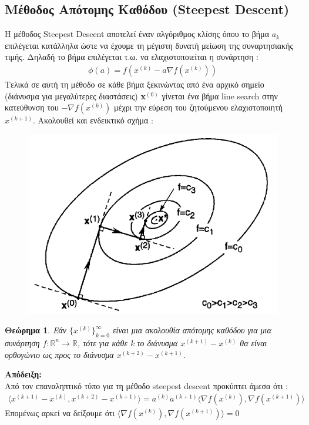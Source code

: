 \documentclass[a4paper,12pt,twoside]{report}
\theoremstyle{plain}
\newtheorem{thm}{Θεώρημα}[section] %
\theoremstyle{definition}
\theoremstyle{remark}
\begin{document}
\subsection{Μέθοδος Απότομης Καθόδου (Steepest Descent)}
Η μέθοδος Steepest Descent αποτελεί έναν αλγόριθμος κλίσης όπου το βήμα $a_{k}$ επιλέγεται κατάλληλα ώστε να έχουμε τη μέγιστη δυνατή μείωση της συναρτησιακής τιμής. Δηλαδή το βήμα επιλέγεται τ.ω. να ελαχιστοποιείται η συνάρτηση :
\begin{align*}
\phi(a) = f(x^{(k)} - a\nabla f(x^{(k)}))
\end{align*}
Tελικά σε αυτή τη μέθοδο σε κάθε βήμα ξεκινώντας από ένα αρχικό σημείο (διάνυσμα για μεγαλύτερες διαστάσεις) \textbf{x}$^{(0)}$ γίνεται ένα  βήμα line search στην κατεύθυνση του $-\nabla f(x^{(k)})$ μέχρι την εύρεση του ζητούμενου ελαχιστοποιητή $x^{(k+1)}$. Ακολουθεί και ενδεικτικό σχήμα :
\begin{figure}[H]
\includegraphics[scale=0.5]{steepest}
\centering
\end{figure}


\begin{thm}
Εάν $\{ x^{(k)}\}_{k=0}^{\infty}$ είναι μια ακολουθία απότομης καθόδου για μια συνάρτηση $f:\mathbb{R} ^n \rightarrow \mathbb{R}$, τότε για κάθε k το διάνυσμα $x^{(k+1)} - x^{(k)}$ θα είναι ορθογώνιο ως προς το διάνυσμα $x^{(k+2)} - x^{(k+1)}$.
\end{thm}

\textbf{Απόδειξη:}\\
Από τον επαναληπτικό τύπο για τη μέθοδο steepest descent προκύπτει άμεσα ότι :
\begin{align*}
\langle x^{(k+1)} - x^{(k)}, x^{(k+2)} - x^{(k+1)}\rangle = a^{(k)}a^{(k+1)}\langle\nabla f(x^{(k)}), \nabla f(x^{(k+1)})\rangle
\end{align*}
Επομένως αρκεί να δείξουμε ότι $\langle\nabla f(x^{(k)}), \nabla f(x^{(k+1)})\rangle=0$
\end{document}
